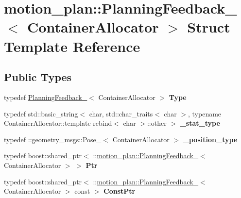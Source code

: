 \hypertarget{structmotion__plan_1_1PlanningFeedback__}{}\section{motion\+\_\+plan\+:\+:Planning\+Feedback\+\_\+$<$ Container\+Allocator $>$ Struct Template Reference}
\label{structmotion__plan_1_1PlanningFeedback__}
\subsection*{Public Types}
\begin{DoxyCompactItemize}
\item 
\mbox{\label{structmotion__plan_1_1PlanningFeedback___a962b1d654a289fff092be22110ea5d6e}} 
typedef \hyperlink{structmotion__plan_1_1PlanningFeedback__}{Planning\+Feedback\+\_\+}$<$ Container\+Allocator $>$ {\bfseries Type}
\item 
\mbox{\label{structmotion__plan_1_1PlanningFeedback___aaa521d465ae42524213a8611d81484f5}} 
typedef std\+::basic\+\_\+string$<$ char, std\+::char\+\_\+traits$<$ char $>$, typename Container\+Allocator\+::template rebind$<$ char $>$\+::other $>$ {\bfseries \+\_\+stat\+\_\+type}
\item 
\mbox{\label{structmotion__plan_1_1PlanningFeedback___a854e2eece23c30c81a0cc699029234b1}} 
typedef \+::geometry\+\_\+msgs\+::\+Pose\+\_\+$<$ Container\+Allocator $>$ {\bfseries \+\_\+position\+\_\+type}
\item 
\mbox{\label{structmotion__plan_1_1PlanningFeedback___a5bec64e1acb11fa8bed401b3211fca99}} 
typedef boost\+::shared\+\_\+ptr$<$ \+::\hyperlink{structmotion__plan_1_1PlanningFeedback__}{motion\+\_\+plan\+::\+Planning\+Feedback\+\_\+}$<$ Container\+Allocator $>$ $>$ {\bfseries Ptr}
\item 
\mbox{\label{structmotion__plan_1_1PlanningFeedback___af364585fac1f07f00fe37225a0124774}} 
typedef boost\+::shared\+\_\+ptr$<$ \+::\hyperlink{structmotion__plan_1_1PlanningFeedback__}{motion\+\_\+plan\+::\+Planning\+Feedback\+\_\+}$<$ Container\+Allocator $>$ const  $>$ {\bfseries Const\+Ptr}
\end{DoxyCompactItemize}
